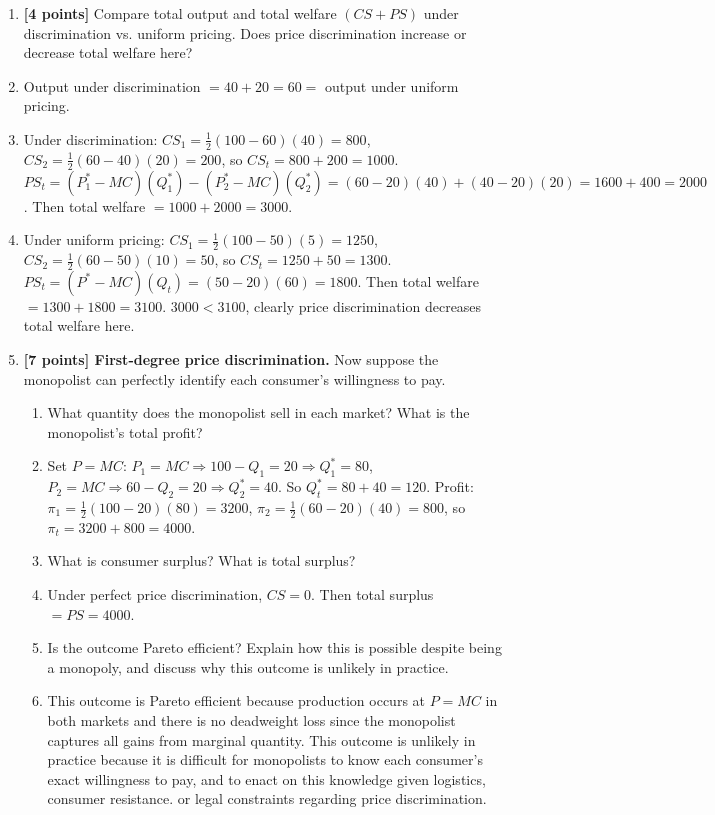 \documentclass[11pt]{article}
\begin{document}
\begin{enumerate}[label=(\alph*)]
    \item \textbf{[4 points]} Compare total output and total welfare $(CS + PS)$ under discrimination vs. uniform pricing. Does price discrimination increase or decrease total welfare here?
    \item[] Output under discrimination $=40+20=60=$ output under uniform pricing.
    \item[] Under discrimination: $CS_1=\frac{1}{2}(100-60)(40)=800$, $CS_2=\frac{1}{2}(60-40)(20)=200$, so $CS_t=800+200=1000$. $PS_t=(P_1^*-MC)(Q_1^*)-(P_2^*-MC)(Q_2^*)=(60-20)(40)+(40-20)(20)=1600+400=2000$. Then total welfare $=1000+2000=3000$.
    \item[] Under uniform pricing: $CS_1=\frac{1}{2}(100-50)(5)=1250$, $CS_2=\frac{1}{2}(60-50)(10)=50$, so $CS_t=1250+50=1300$. $PS_t=(P^*-MC)(Q_t)=(50-20)(60)=1800$. Then total welfare $=1300+1800=3100$. $3000<3100$, clearly price discrimination decreases total welfare here.
    
    \item \textbf{[7 points] First-degree price discrimination.} Now suppose the monopolist can perfectly identify each consumer's willingness to pay.
    \begin{enumerate}[label=(\roman*)]
        \item What quantity does the monopolist sell in each market? What is the monopolist's total profit?
        \item[] Set $P=MC$: $P_1=MC\Rightarrow100-Q_1=20\Rightarrow Q^*_1=80$, $P_2=MC\Rightarrow 60-Q_2=20\Rightarrow Q^*_2=40$. So $Q^*_t=80+40=120$. Profit: $\pi_1=\frac{1}{2}(100-20)(80)=3200$, $\pi_2=\frac{1}{2}(60-20)(40)=800$, so $\pi_t=3200+800=4000$. 
        \item What is consumer surplus? What is total surplus?
        \item[] Under perfect price discrimination, $CS=0$. Then total surplus $=PS=4000$.
        \item Is the outcome Pareto efficient? Explain how this is possible despite being a monopoly, and discuss why this outcome is unlikely in practice.
        \item[] This outcome is Pareto efficient because production occurs at $P=MC$ in both markets and there is no deadweight loss since the monopolist captures all gains from marginal quantity. This outcome is unlikely in practice because it is difficult for monopolists to know each consumer's exact willingness to pay, and to enact on this knowledge given logistics, consumer resistance. or legal constraints regarding price discrimination.
    \end{enumerate}
\end{enumerate}
\end{document}
